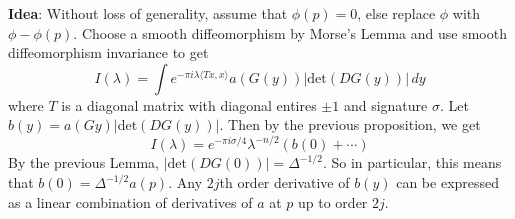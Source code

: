 \documentclass[12pt]{article}
\begin{document}
\noindent \textbf{Idea}: Without loss of generality, assume that $\phi(p)=0$, else replace $\phi$ with $\phi - \phi(p)$. Choose a smooth diffeomorphism by Morse's Lemma and use smooth diffeomorphism invariance to get 
$$I(\lambda) = \int e^{- \pi i \lambda \langle Tx, x \rangle} a(G(y))\vert \text{det} (DG(y))\vert \, dy$$
where $T$ is a diagonal matrix with diagonal entires $\pm 1$ and signature $\sigma$. Let $b(y) = a(Gy) \vert \text{det} (DG(y))\vert$. Then by the previous proposition, we get 
$$I(\lambda) = e^{-\pi i \sigma/4}\lambda^{-n/2}(b(0) + \cdots)$$
By the previous Lemma, $\vert \text{det} (DG(0))\vert = \Delta^{-1/2}$. So in particular, this means that $b(0)= \Delta^{-1/2}a(p)$. Any $2j$th order derivative of $b(y)$ can be expressed as a linear combination of derivatives of $a$ at $p$ up to order $2j$. 
\end{document}
